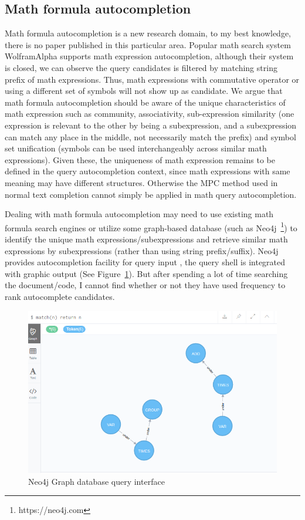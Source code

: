 \documentclass[12pt]{article} %
\begin{document}
\subsection{Math formula autocompletion}
Math formula autocompletion is a new research domain, to my best knowledge, there is no paper published in this particular area. 
Popular math search system WolframAlpha supports math expression autocompletion, although their system is closed, we can observe the query candidates is filtered by matching string prefix of math expressions. 
Thus, math expressions with commutative operator or using a different set of symbols will not show up as candidate.
We argue that math formula autocompletion should be aware of the unique characteristics of math expression such as community, associativity, sub-expression similarity (one expression is relevant to the other by being a subexpression, and a subexpression can match any place in the middle, not necessarily match the prefix) and symbol set unification (symbols can be used interchangeably across similar math expressions).
Given these, the uniqueness of math expression remains to be defined in the query autocompletion context, since math expressions with same meaning may have different structures. Otherwise the MPC method used in normal text completion cannot simply be applied in math query autocompletion.

Dealing with math formula autocompletion may need to use existing math formula search engines or utilize some graph-based database (such as Neo4j~\footnote{https://neo4j.com}) to identify the unique math expressions/subexpressions and retrieve similar math expressions by subexpressions (rather than using string prefix/suffix).
Neo4j provides autocompletion facility for query input \cite{github_src}, the query shell is integrated with graphic output (See Figure~\ref{neo4j}). But after spending a lot of time searching the document/code, I cannot find whether or not they have used frequency to rank autocomplete candidates.

\begin{figure}
\centering
\includegraphics[width=1.0\textwidth]{neo4j.png}
\caption{\label{neo4j}Neo4j Graph database query interface}
\end{figure}
\end{document}
